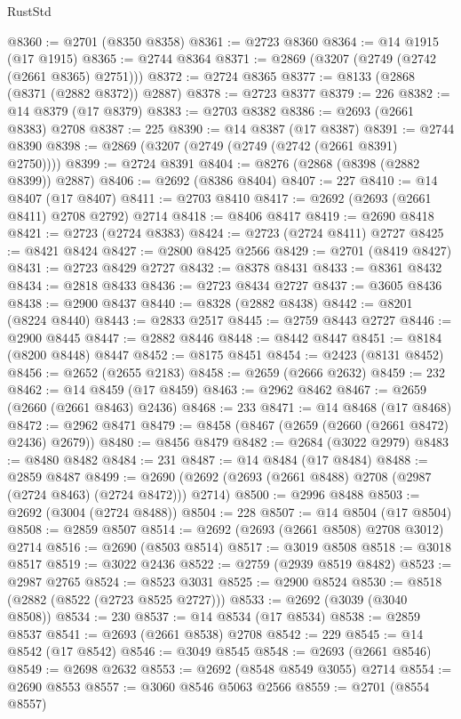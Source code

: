 \begin{lexlean}{RustStd}
\begin{coremodule}
@8360 := @2701 (@8350 @8358)
@8361 := @2723 @8360
@8364 := @14 @1915 (@17 @1915)
@8365 := @2744 @8364
@8371 := @2869 (@3207 (@2749 (@2742 (@2661 @8365) @2751)))
@8372 := @2724 @8365
@8377 := @8133 (@2868 (@8371 (@2882 @8372)) @2887)
@8378 := @2723 @8377
@8379 := 226
@8382 := @14 @8379 (@17 @8379)
@8383 := @2703 @8382
@8386 := @2693 (@2661 @8383) @2708
@8387 := 225
@8390 := @14 @8387 (@17 @8387)
@8391 := @2744 @8390
@8398 := @2869 (@3207 (@2749 (@2749 (@2742 (@2661 @8391) @2750))))
@8399 := @2724 @8391
@8404 := @8276 (@2868 (@8398 (@2882 @8399)) @2887)
@8406 := @2692 (@8386 @8404)
@8407 := 227
@8410 := @14 @8407 (@17 @8407)
@8411 := @2703 @8410
@8417 := @2692 (@2693 (@2661 @8411) @2708 @2792) @2714
@8418 := @8406 @8417
@8419 := @2690 @8418
@8421 := @2723 (@2724 @8383)
@8424 := @2723 (@2724 @8411) @2727
@8425 := @8421 @8424
@8427 := @2800 @8425 @2566
@8429 := @2701 (@8419 @8427)
@8431 := @2723 @8429 @2727
@8432 := @8378 @8431
@8433 := @8361 @8432
@8434 := @2818 @8433
@8436 := @2723 @8434 @2727
@8437 := @3605 @8436
@8438 := @2900 @8437
@8440 := @8328 (@2882 @8438)
@8442 := @8201 (@8224 @8440)
@8443 := @2833 @2517
@8445 := @2759 @8443 @2727
@8446 := @2900 @8445
@8447 := @2882 @8446
@8448 := @8442 @8447
@8451 := @8184 (@8200 @8448) @8447
@8452 := @8175 @8451
@8454 := @2423 (@8131 @8452)
@8456 := @2652 (@2655 @2183)
@8458 := @2659 (@2666 @2632)
@8459 := 232
@8462 := @14 @8459 (@17 @8459)
@8463 := @2962 @8462
@8467 := @2659 (@2660 (@2661 @8463) @2436)
@8468 := 233
@8471 := @14 @8468 (@17 @8468)
@8472 := @2962 @8471
@8479 := @8458 (@8467 (@2659 (@2660 (@2661 @8472) @2436) @2679))
@8480 := @8456 @8479
@8482 := @2684 (@3022 @2979)
@8483 := @8480 @8482
@8484 := 231
@8487 := @14 @8484 (@17 @8484)
@8488 := @2859 @8487
@8499 := @2690 (@2692 (@2693 (@2661 @8488) @2708 (@2987 (@2724 @8463) (@2724 @8472))) @2714)
@8500 := @2996 @8488
@8503 := @2692 (@3004 (@2724 @8488))
@8504 := 228
@8507 := @14 @8504 (@17 @8504)
@8508 := @2859 @8507
@8514 := @2692 (@2693 (@2661 @8508) @2708 @3012) @2714
@8516 := @2690 (@8503 @8514)
@8517 := @3019 @8508
@8518 := @3018 @8517
@8519 := @3022 @2436
@8522 := @2759 (@2939 @8519 @8482)
@8523 := @2987 @2765
@8524 := @8523 @3031
@8525 := @2900 @8524
@8530 := @8518 (@2882 (@8522 (@2723 @8525 @2727)))
@8533 := @2692 (@3039 (@3040 @8508))
@8534 := 230
@8537 := @14 @8534 (@17 @8534)
@8538 := @2859 @8537
@8541 := @2693 (@2661 @8538) @2708
@8542 := 229
@8545 := @14 @8542 (@17 @8542)
@8546 := @3049 @8545
@8548 := @2693 (@2661 @8546)
@8549 := @2698 @2632
@8553 := @2692 (@8548 @8549 @3055) @2714
@8554 := @2690 @8553
@8557 := @3060 @8546 @5063 @2566
@8559 := @2701 (@8554 @8557)

\end{coremodule}
\end{lexlean}
